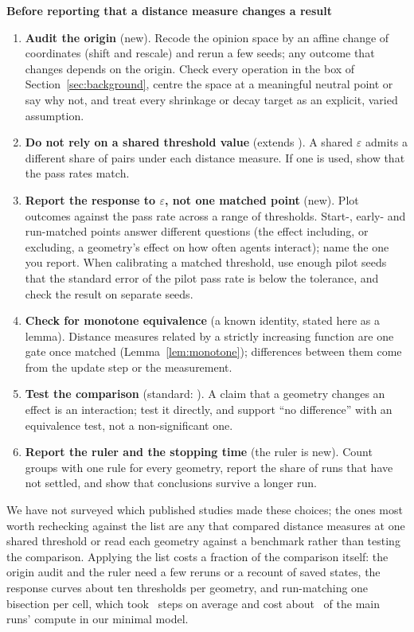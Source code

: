 \documentclass[11pt]{article}
\begin{document}
\begin{framed}
\noindent\textbf{Before reporting that a distance measure changes a result}
\begin{enumerate}
\item \textbf{Audit the origin} (new). Recode the opinion space by an affine change of coordinates (shift and rescale) and rerun a few seeds; any outcome that changes depends on the origin. Check every operation in the box of Section~\ref{sec:background}, centre the space at a meaningful neutral point or say why not, and treat every shrinkage or decay target as an explicit, varied assumption.
\item \textbf{Do not rely on a shared threshold value} (extends \citealp{lorenz2008}). A shared $\varepsilon$ admits a different share of pairs under each distance measure. If one is used, show that the pass rates match.
\item \textbf{Report the response to $\varepsilon$, not one matched point} (new). Plot outcomes against the pass rate across a range of thresholds. Start-, early- and run-matched points answer different questions (the effect including, or excluding, a geometry's effect on how often agents interact); name the one you report. When calibrating a matched threshold, use enough pilot seeds that the standard error of the pilot pass rate is below the tolerance, and check the result on separate seeds.
\item \textbf{Check for monotone equivalence} (a known identity, stated here as a lemma). Distance measures related by a strictly increasing function are one gate once matched (Lemma~\ref{lem:monotone}); differences between them come from the update step or the measurement.
\item \textbf{Test the comparison} (standard: \citealp{gelman2006,lakens2017}). A claim that a geometry changes an effect is an interaction; test it directly, and support ``no difference'' with an equivalence test, not a non-significant one.
\item \textbf{Report the ruler and the stopping time} (the ruler is new). Count groups with one rule for every geometry, report the share of runs that have not settled, and show that conclusions survive a longer run.
\end{enumerate}
\end{framed}
\noindent We have not surveyed which published studies made these choices; the ones most worth rechecking against the list are any that compared distance measures at one shared threshold or read each geometry against a benchmark rather than testing the comparison.
Applying the list costs a fraction of the comparison itself: the origin audit and the ruler need a few reruns or a recount of saved states, the response curves about ten thresholds per geometry, and run-matching one bisection per cell, which took \VCalIterMean\ steps on average and cost about \VCalCostShare\ of the main runs' compute in our minimal model.
\end{document}
